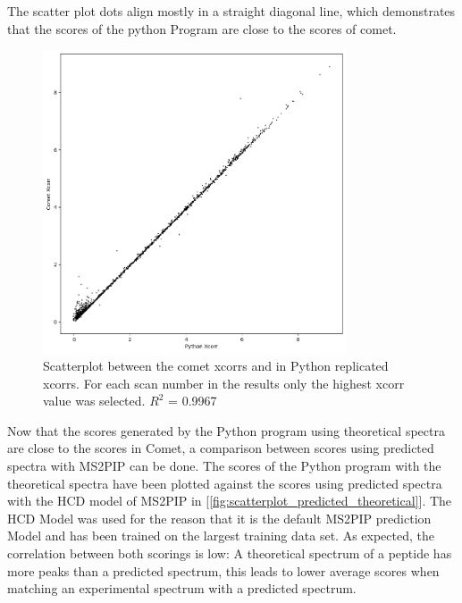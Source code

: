 \documentclass[11pt]{article}
\begin{document}
The scatter plot dots align mostly in a straight diagonal line, which demonstrates that the scores of the python Program are close to the scores of comet. 
\begin{figure}[ht]
\centering
\includegraphics[width=0.8\textwidth]{figs/scatterplot.png}
\caption{Scatterplot between the comet xcorrs and in Python replicated xcorrs. For each scan number in the results only the highest xcorr value was selected. \(R^2\) = 0.9967}
\label{fig:scatterplot}
\end{figure}

Now that the scores generated by the Python program using theoretical spectra are close to the scores in Comet, a comparison between scores using predicted spectra with MS2PIP can be done. The scores of the Python program with the theoretical spectra have been plotted against the scores using predicted spectra with the HCD model of MS2PIP in [\cref{fig:scatterplot_predicted_theoretical}]. The HCD Model was used for the reason that it is the default MS2PIP prediction Model and has been trained on the largest training data set. As expected, the correlation between both scorings is low: A theoretical spectrum of a peptide has more peaks than a predicted spectrum, this leads to lower average scores when matching an experimental spectrum with a predicted spectrum.
\end{document}
